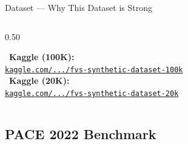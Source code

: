 \documentclass[aspectratio=169,10pt]{beamer}
\renewcommand{\footnotesize}{\tiny}
\begin{document}
\begin{frame}{Dataset — Why This Dataset is Strong}
\begin{columns}[T]
\begin{column}{0.50\textwidth}
\begin{tcolorbox}[greenbox,fontupper=\footnotesize]
        \faDatabase~\textbf{Kaggle (100K):}\\
        \href{https://www.kaggle.com/datasets/tawkirazizrahman/fvs-synthetic-dataset-100k}{%
          \texttt{kaggle.com/.../fvs-synthetic-dataset-100k}}\\[4pt]
        \faDatabase~\textbf{Kaggle (20K):}\\
        \href{https://www.kaggle.com/datasets/tawkirazizrahman/fvs-synthetic-dataset-20k}{%
          \texttt{kaggle.com/.../fvs-synthetic-dataset-20k}}
      \end{tcolorbox}
    \end{column}
  \end{columns}
\end{frame}

\subsection{PACE 2022 Benchmark}
\end{document}
